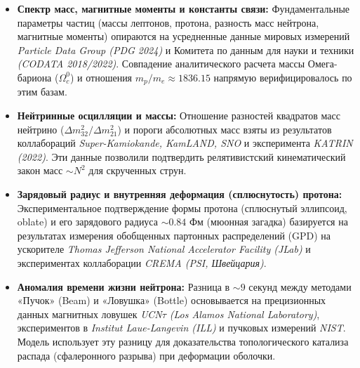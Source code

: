 \documentclass[12pt,a4paper]{article}
\begin{document}
\begin{itemize}
	\item \textbf{Спектр масс, магнитные моменты и константы связи:} 
	Фундаментальные параметры частиц (массы лептонов, протона, разность масс нейтрона, магнитные моменты) опираются на усредненные данные мировых измерений \textit{Particle Data Group (PDG 2024)} и Комитета по данным для науки и техники \textit{(CODATA 2018/2022)}. Совпадение аналитического расчета массы Омега-бариона ($\Omega_c^0$) и отношения $m_p/m_e \approx 1836.15$ напрямую верифицировалось по этим базам.
	
	\item \textbf{Нейтринные осцилляции и массы:} 
	Отношение разностей квадратов масс нейтрино ($\Delta m^2_{32}/\Delta m^2_{21}$) и пороги абсолютных масс взяты из результатов коллабораций \textit{Super-Kamiokande, KamLAND, SNO} и эксперимента \textit{KATRIN (2022)}. Эти данные позволили подтвердить релятивистский кинематический закон масс $\sim N^2$ для скрученных струн.
	
	\item \textbf{Зарядовый радиус и внутренняя деформация (сплюснутость) протона:} 
	Экспериментальное подтверждение формы протона (сплюснутый эллипсоид, oblate) и его зарядового радиуса $\sim 0.84$ Фм (мюонная загадка) базируется на результатах измерения обобщенных партонных распределений (GPD) на ускорителе \textit{Thomas Jefferson National Accelerator Facility (JLab)} и экспериментах коллаборации \textit{CREMA (PSI, Швейцария)}.
	
	\item \textbf{Аномалия времени жизни нейтрона:} 
	Разница в $\sim 9$ секунд между методами «Пучок» (Beam) и «Ловушка» (Bottle) основывается на прецизионных данных магнитных ловушек \textit{UCN$\tau$ (Los Alamos National Laboratory)}, экспериментов в \textit{Institut Laue-Langevin (ILL)} и пучковых измерений \textit{NIST}. Модель использует эту разницу для доказательства топологического катализа распада (сфалеронного разрыва) при деформации оболочки.
\end{itemize}
	
\end{document}
